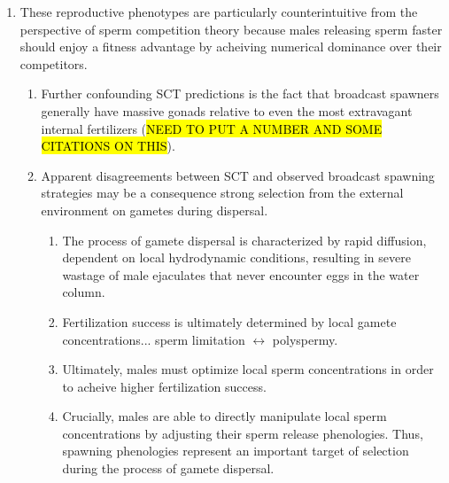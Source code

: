 \documentclass{article}
\begin{document}
\begin{enumerate}
	\item These reproductive phenotypes are particularly counterintuitive from the perspective of sperm competition theory because males releasing sperm faster should enjoy a fitness advantage by acheiving numerical dominance over their competitors.
		\begin{enumerate}
			\item Further confounding SCT predictions is the fact that broadcast spawners generally have massive gonads relative to even the most extravagant internal fertilizers (\hl{NEED TO PUT A NUMBER AND SOME CITATIONS ON THIS}).
			\item Apparent disagreements between SCT and observed broadcast spawning strategies may be a consequence strong selection 	from the external environment on gametes during dispersal.
			\begin{enumerate}
				\item The process of gamete dispersal is characterized by rapid diffusion, dependent on local hydrodynamic conditions, resulting in severe wastage of male ejaculates that never encounter eggs in the water column.
				\item Fertilization success is ultimately determined by local gamete concentrations... sperm limitation \(\leftrightarrow\) polyspermy.
				\item Ultimately, males must optimize local sperm concentrations in order to acheive higher fertilization success.
				\item Crucially, males are able to directly manipulate local sperm concentrations by adjusting their sperm release phenologies. Thus, spawning phenologies represent an important target of selection during the process of gamete dispersal.
			\end{enumerate}	
		\end{enumerate}


\end{enumerate}
\end{document}
